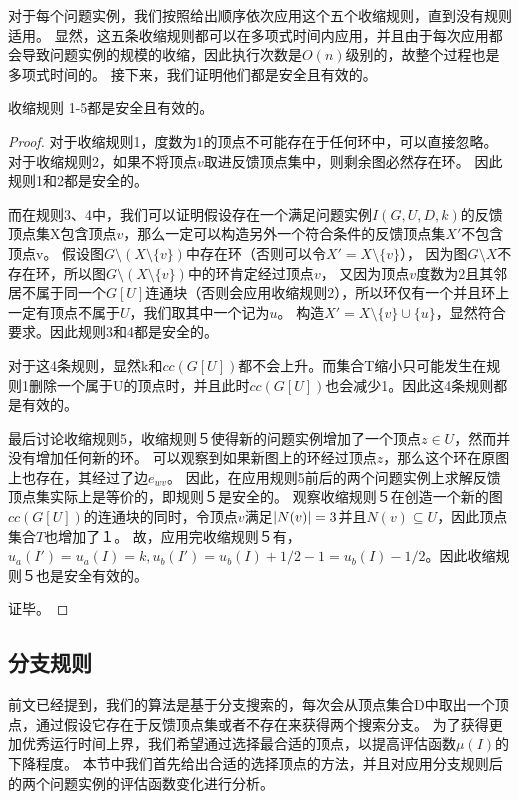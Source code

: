 对于每个问题实例，我们按照给出顺序依次应用这个五个收缩规则，直到没有规则适用。
显然，这五条收缩规则都可以在多项式时间内应用，并且由于每次应用都会导致问题实例的规模的收缩，因此执行次数是$O(n)$级别的，故整个过程也是多项式时间的。
接下来，我们证明他们都是安全且有效的。

\begin{lemma}
收缩规则 1-5都是安全且有效的。
\end{lemma}
\begin{proof}
对于收缩规则1，度数为1的顶点不可能存在于任何环中，可以直接忽略。
对于收缩规则2，如果不将顶点$v$取进反馈顶点集中，则剩余图必然存在环。
因此规则1和2都是安全的。

而在规则3、4中，我们可以证明假设存在一个满足问题实例$I(G, U, D, k)$的反馈顶点集X包含顶点$v$，那么一定可以构造另外一个符合条件的反馈顶点集$X'$不包含顶点v。
假设图$G \setminus (X \setminus \{v\})$中存在环（否则可以令$X' = X \setminus \{v\}$），
因为图$G \setminus X$不存在环，所以图$G \setminus (X \setminus \{v\})$中的环肯定经过顶点$v$，
又因为顶点$v$度数为$2$且其邻居不属于同一个$G[U]$连通块（否则会应用收缩规则2），所以环仅有一个并且环上一定有顶点不属于$U$，我们取其中一个记为$u$。
构造$X' = X \setminus \{v\} \cup \{u\}$，显然符合要求。因此规则3和4都是安全的。

对于这4条规则，显然k和$cc(G[U])$都不会上升。而集合T缩小只可能发生在规则1删除一个属于U的顶点时，并且此时$cc(G[U])$也会减少1。因此这4条规则都是有效的。

最后讨论收缩规则5，收缩规则５使得新的问题实例增加了一个顶点$z \in U$，然而并没有增加任何新的环。
可以观察到如果新图上的环经过顶点$z$，那么这个环在原图上也存在，其经过了边$e_{wv}$。
因此，在应用规则5前后的两个问题实例上求解反馈顶点集实际上是等价的，即规则５是安全的。
观察收缩规则５在创造一个新的图$cc(G[U])$的连通块的同时，令顶点$v$满足$\left\vert N(v) \right\vert = 3$并且$N(v) \subseteq U$，因此顶点集合$T$也增加了１。
故，应用完收缩规则５有，$u_a(I') = u_a(I) = k, u_b(I') = u_b(I) + 1/2 - 1 = u_b(I) - 1/2$。因此收缩规则５也是安全有效的。

证毕。
\end{proof}


\subsection{分支规则}
前文已经提到，我们的算法是基于分支搜索的，每次会从顶点集合D中取出一个顶点，通过假设它存在于反馈顶点集或者不存在来获得两个搜索分支。
为了获得更加优秀运行时间上界，我们希望通过选择最合适的顶点，以提高评估函数$\mu(I)$的下降程度。
本节中我们首先给出合适的选择顶点的方法，并且对应用分支规则后的两个问题实例的评估函数变化进行分析。

